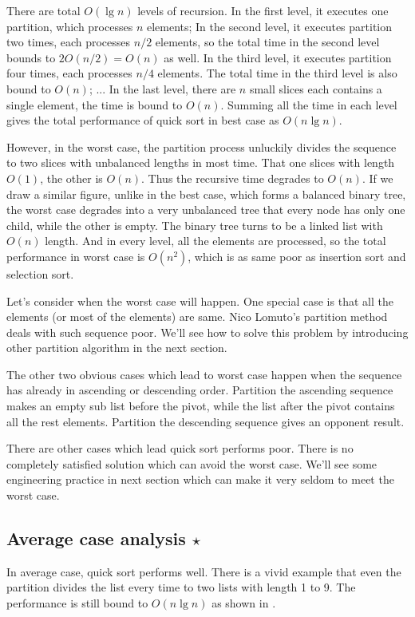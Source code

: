 \documentclass[UTF8]{article}
\begin{document}
There are total $O(\lg n)$ levels of recursion. In the first level, it executes one partition, which
 processes $n$ elements; In the second level, it executes partition two times, each processes $n/2$
elements, so the total time in the second level bounds to $2 O(n/2) = O(n)$ as well. In the third
level, it executes partition four times, each processes $n/4$ elements. The total time in the third
level is also bound to $O(n)$; ... In the last level, there are $n$ small slices each contains a
single element, the time is bound to $O(n)$. Summing all the time in each level gives the total
performance of quick sort in best case as $O(n \lg n)$.

However, in the worst case, the partition process unluckily divides the sequence to two slices
with unbalanced lengths in most time. That one slices with length $O(1)$, the other is $O(n)$.
Thus the recursive time degrades to $O(n)$. If we draw a similar figure, unlike in the best
case, which forms a balanced binary tree, the worst case degrades into a very unbalanced tree
that every node has only one child, while the other is empty. The binary tree turns to be
a linked list with $O(n)$ length. And in every level, all the elements are processed, so the
total performance in worst case is $O(n^2)$, which is as same poor as insertion sort and
selection sort.

Let's consider when the worst case will happen. One special case is that
all the elements (or most of the elements) are same. Nico Lomuto's partition method deals
with such sequence poor. We'll see how to solve this problem by introducing other
partition algorithm in the next section.

The other two obvious cases which lead to worst case happen when the sequence has already in
ascending or descending order. Partition the ascending sequence makes an empty sub list
before the pivot, while the list after the pivot contains all the rest elements.
Partition the descending sequence gives an opponent result.

There are other cases which lead quick sort performs poor. There is no completely satisfied solution
which can avoid the worst case. We'll see some engineering practice in next section which can
make it very seldom to meet the worst case.

\subsection{Average case analysis $\star$}
In average case, quick sort performs well. There is a vivid example that even the partition
divides the list every time to two lists with length 1 to 9. The performance is still bound
to $O(n \lg n)$ as shown in \cite{CLRS}.
\end{document}

